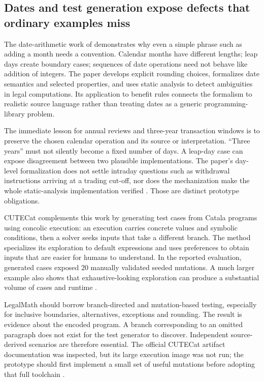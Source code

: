 

\subsection{Dates and test generation expose defects that ordinary examples miss}

The date-arithmetic work of \citet{dates2024} demonstrates why even a simple phrase
such as adding a month needs a convention. Calendar months have different
lengths; leap days create boundary cases; sequences of date operations need not
behave like addition of integers. The paper develops explicit rounding choices,
formalizes date semantics and selected properties, and uses static analysis to
detect ambiguities in legal computations. Its application to benefit rules
connects the formalism to realistic source language rather than treating dates
as a generic programming-library problem.

The immediate lesson for annual reviews and three-year transaction windows is
to preserve the chosen calendar operation and its source or interpretation.
``Three years'' must not silently become a fixed number of days. A leap-day case
can expose disagreement between two plausible implementations. The paper's
day-level formalization does not settle intraday questions such as withdrawal
instructions arriving at a trading cut-off, nor does the mechanization make the
whole static-analysis implementation verified
\citep[secs.~2--6]{dates2024}. Those are distinct prototype obligations.

CUTECat complements this work by generating test cases from Catala programs using
concolic execution: an execution carries concrete values and symbolic conditions,
then a solver seeks inputs that take a different branch. The method specializes
its exploration to default expressions and uses preferences to obtain inputs
that are easier for humans to understand. In the reported evaluation, generated
cases exposed 20 manually validated seeded mutations. A much larger example also
shows that exhaustive-looking exploration can produce a substantial volume of
cases and runtime \citep[secs.~3--5]{cutecat2025}.

LegalMath should borrow branch-directed and mutation-based testing, especially
for inclusive boundaries, alternatives, exceptions and rounding. The result is
evidence about the encoded program. A branch corresponding to an omitted
paragraph does not exist for the test generator to discover. Independent
source-derived scenarios are therefore essential. The official CUTECat artifact
documentation was inspected, but its large execution image was not run; the
prototype should first implement a small set of useful mutations before adopting
that full toolchain \citep{libraryreview}.

